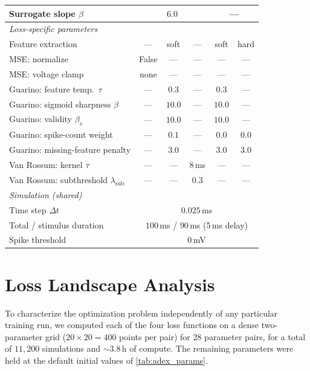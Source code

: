 \documentclass[final, english, biblatex]{kththesis}
\begin{document}
\begin{landscape}
\begin{table}[t]
\begin{tabular}{lccccc}
Surrogate slope $\beta$   & \multicolumn{3}{c}{$6.0$}                                     & \multicolumn{2}{c}{---} \\
\midrule
\multicolumn{6}{l}{\textit{Loss-specific parameters}} \\
Feature extraction        & ---   & soft    & ---     & soft    & hard \\
MSE: normalize            & False & ---     & ---     & ---     & --- \\
MSE: voltage clamp        & none  & ---     & ---     & ---     & --- \\
Guarino: feature temp.\ $\tau$ & --- & $0.3$ & ---   & $0.3$   & --- \\
Guarino: sigmoid sharpness $\beta$ & --- & $10.0$ & --- & $10.0$ & --- \\
Guarino: validity $\beta_v$ & --- & $10.0$ & ---    & $10.0$  & --- \\
Guarino: spike-count weight & --- & $0.1$ & ---     & $0.0$   & $0.0$ \\
Guarino: missing-feature penalty & --- & $3.0$ & --- & $3.0$  & $3.0$ \\
Van Rossum: kernel $\tau$ & ---   & ---     & $8$\,ms & ---   & --- \\
Van Rossum: subthreshold $\lambda_{\text{sub}}$ & --- & --- & $0.3$ & --- & --- \\
\midrule
\multicolumn{6}{l}{\textit{Simulation (shared)}} \\
Time step $\Delta t$       & \multicolumn{5}{c}{$0.025$\,ms} \\
Total / stimulus duration & \multicolumn{5}{c}{$100\,$ms / $90\,$ms (5\,ms delay)} \\
Spike threshold            & \multicolumn{5}{c}{$0$\,mV} \\
\bottomrule
\end{tabular}
\end{table}
\end{landscape}

\section{Loss Landscape Analysis}\label{sec:app:loss}
To characterize the optimization problem independently of any particular training run, we computed each of the four loss functions on a dense two-parameter grid ($20 \times 20 = 400$ points per pair) for 28 parameter pairs, for a total of $11{,}200$ simulations and $\sim$3.8\,h of compute.
The remaining parameters were held at the default initial values of \cref{tab:adex_params}.
\end{document}
